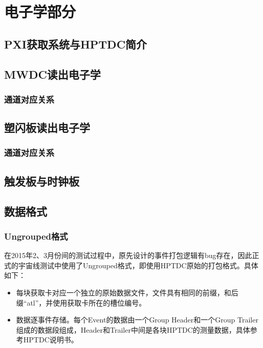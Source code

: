 \chapter{电子学部分}
\section{PXI获取系统与HPTDC简介}

\section{MWDC读出电子学}

\subsection{通道对应关系}

\section{塑闪板读出电子学}

\subsection{通道对应关系}

\section{触发板与时钟板}

\section{数据格式}
\subsection{Ungrouped格式}
在2015年2、3月份间的测试过程中，原先设计的事件打包逻辑有bug存在，因此正式的宇宙线测试中使用了Ungrouped格式，即使用HPTDC原始的打包格式。具体如下：
\begin{itemize}
	\item 每块获取卡对应一个独立的原始数据文件，文件具有相同的前缀，和后缀“atl”，并使用获取卡所在的槽位编号。
	\item 数据逐事件存储。每个Event的数据由一个Group Header和一个Group Trailer组成的数据段组成，Header和Trailer中间是各块HPTDC的测量数据，具体参考HPTDC说明书。
\end{itemize}


